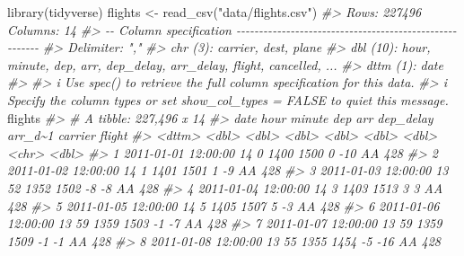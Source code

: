 \documentclass[
]{book}
\newenvironment{Shaded}{\begin{snugshade}}{\end{snugshade}}
\newcommand{\CommentTok}[1]{\textcolor[rgb]{0.56,0.35,0.01}{\textit{#1}}}
\newcommand{\FunctionTok}[1]{\textcolor[rgb]{0.00,0.00,0.00}{#1}}
\newcommand{\NormalTok}[1]{#1}
\newcommand{\OtherTok}[1]{\textcolor[rgb]{0.56,0.35,0.01}{#1}}
\newcommand{\StringTok}[1]{\textcolor[rgb]{0.31,0.60,0.02}{#1}}
\begin{document}
\begin{Shaded}
\begin{Highlighting}[]
\FunctionTok{library}\NormalTok{(tidyverse)}
\NormalTok{flights }\OtherTok{\textless{}{-}} \FunctionTok{read\_csv}\NormalTok{(}\StringTok{"data/flights.csv"}\NormalTok{)}
\CommentTok{\#\textgreater{} Rows: 227496 Columns: 14}
\CommentTok{\#\textgreater{} {-}{-} Column specification {-}{-}{-}{-}{-}{-}{-}{-}{-}{-}{-}{-}{-}{-}{-}{-}{-}{-}{-}{-}{-}{-}{-}{-}{-}{-}{-}{-}{-}{-}{-}{-}{-}{-}{-}{-}{-}{-}{-}{-}{-}{-}{-}{-}{-}{-}{-}{-}{-}{-}{-}{-}{-}{-}{-}{-}}
\CommentTok{\#\textgreater{} Delimiter: ","}
\CommentTok{\#\textgreater{} chr   (3): carrier, dest, plane}
\CommentTok{\#\textgreater{} dbl  (10): hour, minute, dep, arr, dep\_delay, arr\_delay, flight, cancelled, ...}
\CommentTok{\#\textgreater{} dttm  (1): date}
\CommentTok{\#\textgreater{} }
\CommentTok{\#\textgreater{} i Use \textasciigrave{}spec()\textasciigrave{} to retrieve the full column specification for this data.}
\CommentTok{\#\textgreater{} i Specify the column types or set \textasciigrave{}show\_col\_types = FALSE\textasciigrave{} to quiet this message.}
\NormalTok{flights}
\CommentTok{\#\textgreater{} \# A tibble: 227,496 x 14}
\CommentTok{\#\textgreater{}    date                 hour minute   dep   arr dep\_delay arr\_d\textasciitilde{}1 carrier flight}
\CommentTok{\#\textgreater{}    \textless{}dttm\textgreater{}              \textless{}dbl\textgreater{}  \textless{}dbl\textgreater{} \textless{}dbl\textgreater{} \textless{}dbl\textgreater{}     \textless{}dbl\textgreater{}   \textless{}dbl\textgreater{} \textless{}chr\textgreater{}    \textless{}dbl\textgreater{}}
\CommentTok{\#\textgreater{}  1 2011{-}01{-}01 12:00:00    14      0  1400  1500         0     {-}10 AA         428}
\CommentTok{\#\textgreater{}  2 2011{-}01{-}02 12:00:00    14      1  1401  1501         1      {-}9 AA         428}
\CommentTok{\#\textgreater{}  3 2011{-}01{-}03 12:00:00    13     52  1352  1502        {-}8      {-}8 AA         428}
\CommentTok{\#\textgreater{}  4 2011{-}01{-}04 12:00:00    14      3  1403  1513         3       3 AA         428}
\CommentTok{\#\textgreater{}  5 2011{-}01{-}05 12:00:00    14      5  1405  1507         5      {-}3 AA         428}
\CommentTok{\#\textgreater{}  6 2011{-}01{-}06 12:00:00    13     59  1359  1503        {-}1      {-}7 AA         428}
\CommentTok{\#\textgreater{}  7 2011{-}01{-}07 12:00:00    13     59  1359  1509        {-}1      {-}1 AA         428}
\CommentTok{\#\textgreater{}  8 2011{-}01{-}08 12:00:00    13     55  1355  1454        {-}5     {-}16 AA         428}

\end{Highlighting}
\end{Shaded}
\end{document}
